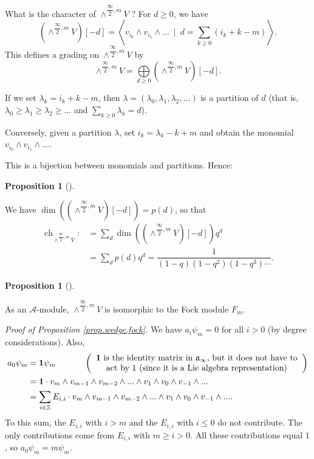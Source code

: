 \documentclass
[numbers=enddot,12pt,final,onecolumn,german,notitlepage]{scrartcl}%
\theoremstyle{definition}
\newtheorem{prop}[theo]{Proposition}
\newenvironment{proposition}[1][]
{\begin{prop}[#1]\begin{leftbar}}
{\end{leftbar}\end{prop}}
\begin{document}
What is the character of $\wedge^{\dfrac{\infty}{2},m}V$ ? For $d\geq0$, we
have%
\[
\left(  \wedge^{\dfrac{\infty}{2},m}V\right)  \left[  -d\right]  =\left\langle
v_{i_{0}}\wedge v_{i_{1}}\wedge...\ \mid\ d=\sum\limits_{k\geq0}\left(
i_{k}+k-m\right)  \right\rangle .
\]
This defines a grading on $\wedge^{\dfrac{\infty}{2},m}V$ by%
\[
\wedge^{\dfrac{\infty}{2},m}V=\bigoplus\limits_{d\geq0}\left(  \wedge
^{\dfrac{\infty}{2},m}V\right)  \left[  -d\right]  .
\]


If we set $\lambda_{k}=i_{k}+k-m$, then $\lambda=\left(  \lambda_{0}%
,\lambda_{1},\lambda_{2},...\right)  $ is a partition of $d$ (that is,
$\lambda_{0}\geq\lambda_{1}\geq\lambda_{2}\geq...$ and $\sum\limits_{k\geq
0}\lambda_{k}=d$).

Conversely, given a partition $\lambda$, set $i_{k}=\lambda_{k}-k+m$ and
obtain the monomial $v_{i_{0}}\wedge v_{i_{1}}\wedge...$.

This is a bijection between monomials and partitions. Hence:

\begin{proposition}
We have $\dim\left(  \left(  \wedge^{\dfrac{\infty}{2},m}V\right)  \left[
-d\right]  \right)  =p\left(  d\right)  $, so that%
\begin{align*}
\operatorname*{ch}\nolimits_{\wedge^{\dfrac{\infty}{2},m}V}:  &  =\sum_{d}%
\dim\left(  \left(  \wedge^{\dfrac{\infty}{2},m}V\right)  \left[  -d\right]
\right)  q^{d}\\
&  =\sum_{d}p\left(  d\right)  q^{d}=\dfrac{1}{\left(  1-q\right)  \left(
1-q^{2}\right)  \left(  1-q^{3}\right)  \cdots}.
\end{align*}

\end{proposition}

\begin{proposition}
\label{prop.wedge.fock}As an $\mathcal{A}$-module, $\wedge^{\dfrac{\infty}%
{2},m}V$ is isomorphic to the Fock module $F_{m}$.
\end{proposition}

\textit{Proof of Proposition \ref{prop.wedge.fock}.} We have $a_{i}\psi_{m}=0$
for all $i>0$ (by degree considerations). Also,%
\begin{align*}
a_{0}\psi_{m}  &  =\mathbf{1}\psi_{m}\ \ \ \ \ \ \ \ \ \ \left(
\begin{array}
[c]{c}%
\mathbf{1}\text{ is the identity matrix in }\mathfrak{a}_{\infty}\text{, but
it does not have to}\\
\text{act by }1\text{ (since it is a Lie algebra representation)}%
\end{array}
\right) \\
&  =\mathbf{1}\cdot v_{m}\wedge v_{m-1}\wedge v_{m-2}\wedge...\wedge
v_{1}\wedge v_{0}\wedge v_{-1}\wedge...\\
&  =\sum\limits_{i\in\mathbb{Z}}E_{i,i}\cdot v_{m}\wedge v_{m-1}\wedge
v_{m-2}\wedge...\wedge v_{1}\wedge v_{0}\wedge v_{-1}\wedge....
\end{align*}
To this sum, the $E_{i,i}$ with $i>m$ and the $E_{i,i}$ with $i\leq0$ do not
contribute. The only contributions come from $E_{i,i}$ with $m\geq i>0$. All
these contributions equal $1$, so $a_{0}\psi_{m}=m\psi_{m}$.
\end{document}
